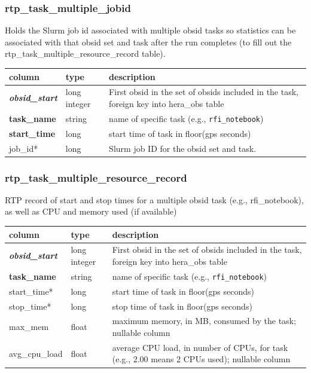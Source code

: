 \documentclass{article}
\begin{document}
{\subsubsection{rtp\_task\_multiple\_jobid}
Holds the Slurm job id associated with multiple obsid tasks so statistics can be associated with
that obsid set and task after the run completes (to fill out the rtp\_task\_multiple\_resource\_record table).
\begin{center}
  \begin{tabular}{| p{4cm} | p{2cm} | p{10cm} |}
\hline
 column & type & description \\ [0.5ex] \hline\hline
\textit{\textbf{obsid\_start}} & long integer & First obsid in the set of obsids included in the task, foreign key into hera\_obs table \\ \hline
\textbf{task\_name} & string & name of specific task (e.g., \verb+rfi_notebook+) \\ \hline
\textbf{start\_time} & long & start time of task in floor(gps seconds) \\ \hline
job\_id* & long &  Slurm job ID for the obsid set and task. \\ \hline
\end{tabular}
\end{center}

\subsubsection{rtp\_task\_multiple\_resource\_record}
RTP record of start and stop times for a multiple obsid task (e.g., rfi\_notebook), as well as CPU and memory used (if available)
\begin{center}
  \begin{tabular}{| p{4cm} | p{2cm} | p{10cm} |}
\hline
 column & type & description \\ [0.5ex] \hline\hline
\textit{\textbf{obsid\_start}} & long integer & First obsid in the set of obsids included in the task, foreign key into hera\_obs table \\ \hline
\textbf{task\_name} & string & name of specific task (e.g., \verb+rfi_notebook+) \\ \hline
start\_time* & long & start time of task in floor(gps seconds) \\ \hline
stop\_time* & long & stop time of task in floor(gps seconds) \\ \hline
max\_mem & float & maximum memory, in MB, consumed by the task; nullable column \\ \hline
avg\_cpu\_load & float & average CPU load, in number of CPUs, for task (e.g., 2.00 means 2 CPUs used); nullable column \\ \hline
\end{tabular}
\end{center}

}
\end{document}

